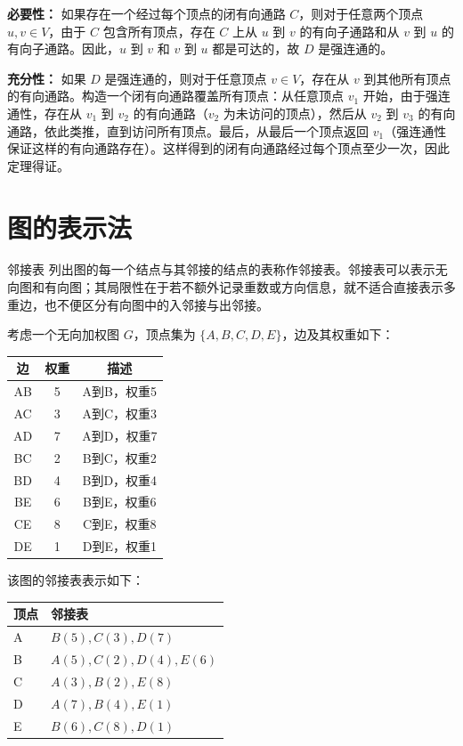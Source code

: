 \textbf{必要性：} 如果存在一个经过每个顶点的闭有向通路 $C$，则对于任意两个顶点 $u, v \in V$，由于 $C$ 包含所有顶点，存在 $C$ 上从 $u$ 到 $v$ 的有向子通路和从 $v$ 到 $u$ 的有向子通路。因此，$u$ 到 $v$ 和 $v$ 到 $u$ 都是可达的，故 $D$ 是强连通的。

\textbf{充分性：} 如果 $D$ 是强连通的，则对于任意顶点 $v \in V$，存在从 $v$ 到其他所有顶点的有向通路。构造一个闭有向通路覆盖所有顶点：从任意顶点 $v_1$ 开始，由于强连通性，存在从 $v_1$ 到 $v_2$ 的有向通路（$v_2$ 为未访问的顶点），然后从 $v_2$ 到 $v_3$ 的有向通路，依此类推，直到访问所有顶点。最后，从最后一个顶点返回 $v_1$（强连通性保证这样的有向通路存在）。这样得到的闭有向通路经过每个顶点至少一次，因此定理得证。

\section{图的表示法}
\begin{definition}{邻接表}{}
    列出图的每一个结点与其邻接的结点的表称作邻接表。邻接表可以表示无向图和有向图；其局限性在于若不额外记录重数或方向信息，就不适合直接表示多重边，也不便区分有向图中的入邻接与出邻接。
\end{definition}
考虑一个无向加权图 $G$，顶点集为 $\{A, B, C, D, E\}$，边及其权重如下：
\begin{center}
\begin{tabular}{c|c|c}
边 & 权重 & 描述 \\
\hline
AB & 5 & A到B，权重5 \\
AC & 3 & A到C，权重3 \\
AD & 7 & A到D，权重7 \\
BC & 2 & B到C，权重2 \\
BD & 4 & B到D，权重4 \\
BE & 6 & B到E，权重6 \\
CE & 8 & C到E，权重8 \\
DE & 1 & D到E，权重1 \\
\end{tabular}
\end{center}
该图的邻接表表示如下：
\begin{center}
\begin{tabular}{l|l}
顶点 & 邻接表 \\
\hline
A & $B(5) , C(3) , D(7)$ \\
B & $A(5) , C(2) , D(4) , E(6)$ \\
C & $A(3) , B(2) , E(8)$ \\
D & $A(7) , B(4) , E(1)$ \\
E & $B(6) , C(8) , D(1)$ \\
\end{tabular}
\end{center}
